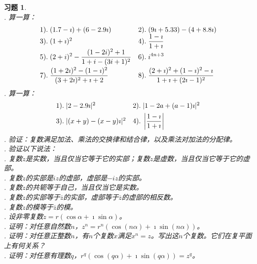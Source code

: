 \documentclass[12pt,UTF8]{ctexbook}
\theoremstyle{definition}
\theoremstyle{plain}
\newtheorem{xt}{习题}[section]
\begin{document}
\begin{xt}
    \mbox{} \\
    . 算一算：
    $$
    \begin{array}[]{ll}
        1). \;(1.7 - \imath) + (6 - 2.9\imath)   & 2).\; (9\imath + 5.33) - (4 + 8.8\imath) \\
        3). \;(1+\imath)^2                       & 4). \;\displaystyle \frac{1 - \imath}{1 + \imath} \\
        5). \;\displaystyle (2 + i)^2 - \frac{(1 - 2i)^2 + 1}{1 + i - (3i + 1)^2 }   & 6). \;\displaystyle i^{4n+3} \\[8pt]
        7). \;\displaystyle\frac{(1 + 2\imath)^2 - (1 - \imath)^2}{(3 + 2\imath)^2 + \imath + 2} & 8). \;\displaystyle\frac{(2 + \imath)^2 + (1 - \imath)^2 - \imath}{1 + \imath + (2\imath - 1)^2} \\
    \end{array}
    $$
    . 算一算：
    $$
    \begin{array}[]{ll}
        1). \;|2 - 2.9\imath|^2   & 2).\; |1 - 2a + (a - 1)\imath|^2 \\[4pt]
        3). \;|(x + y) - (x - y)\imath|^2   & 4).\;\displaystyle\left|\frac{1 - \imath}{1 + \imath} \right|\\
    \end{array}
    $$
    . 验证：复数满足加法、乘法的交换律和结合律，以及乘法对加法的分配律。\\
    . 验证以下说法：\\
    . 复数$z$是实数，当且仅当它等于它的实部；复数$z$是虚数，当且仅当它等于它的虚部。\\
    . 复数$z$的实部是$iz$的虚部，虚部是$-iz$的实部。\\
    . 复数$z$的共轭等于自己，当且仅当它是实数。\\
    . 复数$z$的实部等于$\overline{z}$的实部，虚部等于$\overline{z}$的虚部的相反数。\\
    . 复数$z$的模等于$\overline{z}$的模。\\
    . 设非零复数$z = r(\cos{\alpha} + \imath\sin{\alpha})$。\\
    . 证明：对任意自然数$n$，$z^n = r^n(\cos{(n\alpha)} + \imath\sin{(n\alpha)})$。 \\
    . 证明：对任意正整数$n$，有$n$个复数$x$满足$x^n = z$。写出这$n$个复数。它们在复平面上有何关系？\\
    . 证明：对任意有理数$q$，$r^q(\cos{(q\alpha)} + \imath\sin{(q\alpha)}) = z^q$。 \\

\end{xt}
\end{document}
